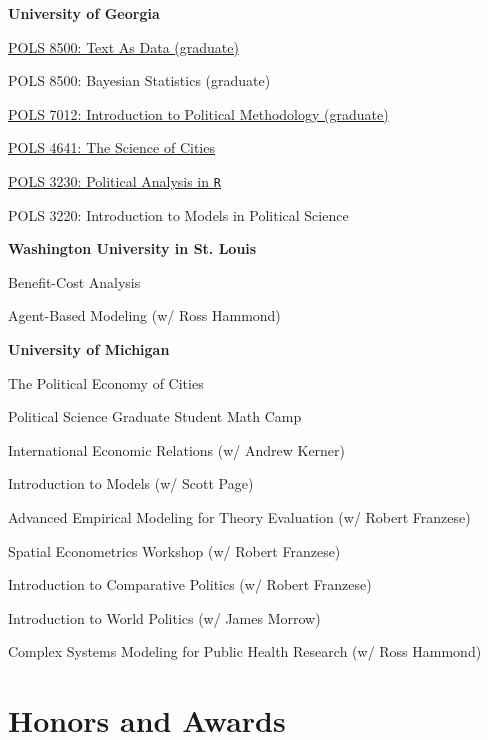 \documentclass[margin,line]{res}
\newenvironment{list1}{
  \begin{list}{}{%
      \setlength{\itemsep}{0.1in}
      \setlength{\parsep}{0in} \setlength{\parskip}{0in}
      \setlength{\topsep}{0.1in} \setlength{\partopsep}{0in} 
      \setlength{\leftmargin}{0.17in}}}{\end{list}}
\begin{document}
\begin{resume}
\textbf{University of Georgia}
\begin{list1}
	\item[] \href{https://joeornstein.github.io/text-as-data//}{POLS 8500: Text As Data (graduate)}
	\item[] POLS 8500: Bayesian Statistics (graduate)
	\item[] \href{https://joeornstein.github.io/pols-7012//}{POLS 7012: Introduction to Political Methodology (graduate)}
	\item[] \href{https://joeornstein.github.io/pols-4641/}{POLS 4641: The Science of Cities}
	\item[] \href{https://joeornstein.github.io/pols-3230/}{POLS 3230: Political Analysis in \texttt{R}}
	\item[] POLS 3220: Introduction to Models in Political Science
\end{list1}

\textbf{Washington University in St. Louis}
\begin{list1}
	\item[] Benefit-Cost Analysis
	\item[] Agent-Based Modeling (w/ Ross Hammond)
\end{list1}

\textbf{University of Michigan}
\begin{list1}
	\item[] The Political Economy of Cities
	\item[] Political Science Graduate Student Math Camp
	\item International Economic Relations (w/ Andrew Kerner)
	\item Introduction to Models (w/ Scott Page)
	\item Advanced Empirical Modeling for Theory Evaluation (w/ Robert Franzese)
	\item Spatial Econometrics Workshop (w/ Robert Franzese)
	\item Introduction to Comparative Politics (w/ Robert Franzese)
	\item Introduction to World Politics (w/ James Morrow)
	\item Complex Systems Modeling for Public Health Research (w/ Ross Hammond)
\end{list1}



\section{\sc Honors and Awards} 


\end{resume}
\end{document}
